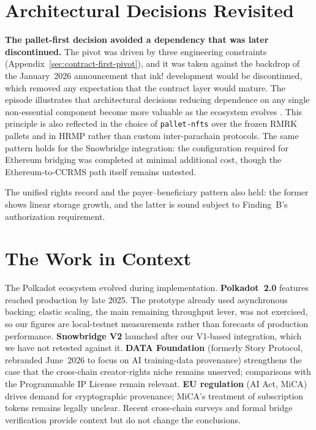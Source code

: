 \section{Architectural Decisions Revisited}\label{sec:architectural-decisions-revisited}

\textbf{The pallet-first decision avoided a dependency that was later discontinued.} The pivot was driven by three engineering constraints (Appendix~\ref{sec:contract-first-pivot}), and it was taken against the backdrop of the January~2026 announcement that ink! development would be discontinued, which removed any expectation that the contract layer would mature. The episode illustrates that architectural decisions reducing dependence on any single non-essential component become more valuable as the ecosystem evolves \citep{parnas1972, bassEtAl2021}. This principle is also reflected in the choice of \texttt{pallet-nfts} over the frozen RMRK pallets and in HRMP rather than custom inter-parachain protocols. The same pattern holds for the Snowbridge integration: the configuration required for Ethereum bridging was completed at minimal additional cost, though the Ethereum-to-CCRMS path itself remains untested.

The unified rights record and the payer--beneficiary pattern also held: the former shows linear storage growth, and the latter is sound subject to Finding~B's authorization requirement.

\section{The Work in Context}\label{sec:work-in-context}

The Polkadot ecosystem evolved during implementation. \textbf{Polkadot~2.0} features reached production by late 2025. The prototype already used asynchronous backing; elastic scaling, the main remaining throughput lever, was not exercised, so our figures are local-testnet measurements rather than forecasts of production performance. \textbf{Snowbridge V2} launched after our V1-based integration, which we have not retested against it. \textbf{DATA Foundation} (formerly Story Protocol, rebranded June~2026 to focus on AI training-data provenance) strengthens the case that the cross-chain creator-rights niche remains unserved; comparisons with the Programmable IP License remain relevant. \textbf{EU regulation} (AI Act, MiCA) drives demand for cryptographic provenance; MiCA's treatment of subscription tokens remains legally unclear. Recent cross-chain surveys \citep{dengEtAl2025, liEtAl2025a} and formal bridge verification \citep{maricEtAl2025} provide context but do not change the conclusions.


